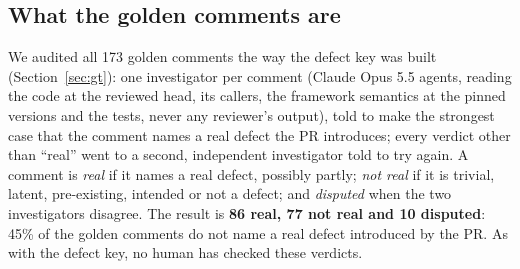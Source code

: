 \documentclass[11pt,a4paper]{article}
\begin{document}
\subsection{What the golden comments are}
\label{sec:martianaudit}

We audited all 173 golden comments the way the defect key was built
(Section~\ref{sec:gt}): one investigator per comment (Claude Opus 5.5 agents,
reading the code at the reviewed head, its callers, the framework semantics at
the pinned versions and the tests, never any reviewer's output), told to make
the strongest case that the comment names a real defect the PR introduces;
every verdict other than ``real'' went to a second, independent investigator
told to try again. A comment is \emph{real} if it names a real defect,
possibly partly; \emph{not real} if it is trivial, latent, pre-existing,
intended or not a defect; and \emph{disputed} when the two investigators
disagree. The result is \textbf{86 real, 77 not real and 10 disputed}: 45\%
of the golden comments do not name a real defect introduced by the PR. As
with the defect key, no human has checked these verdicts.
\end{document}

